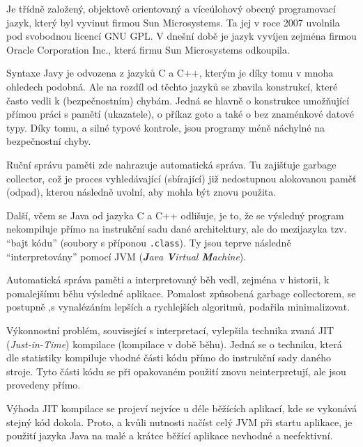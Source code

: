 Je třídně založený, objektově orientovaný a víceúlohový obecný programovací jazyk, který byl vyvinut firmou Sun Microsystems. Ta jej v roce 2007 uvolnila pod svobodnou licencí GNU GPL. V dnešní době je jazyk vyvíjen zejména firmou Oracle Corporation Inc., která firmu Sun Microsystems odkoupila.

Syntaxe Javy je odvozena z jazyků C a C++, kterým je díky tomu v mnoha ohledech podobná. Ale na rozdíl od těchto jazyků se zbavila konstrukcí, které často vedli k (bezpečnostním) chybám. Jedná se hlavně o konstrukce umožňující přímou práci s pamětí (ukazatele), o příkaz goto a také o bez znaménkové datové typy. Díky tomu, a silné typové kontrole, jsou programy méně náchylné na bezpečnostní chyby.

Ruční správu paměti zde nahrazuje automatická správa. Tu zajišťuje garbage collector, což je proces vyhledávající (sbírající) již nedostupnou alokovanou paměť (odpad), kterou následně uvolní, aby mohla být znovu použita.

Další, včem se Java od jazyka C a C++ odlišuje, je to, že se výsledný program nekompiluje přímo na instrukční sadu dané architektury, ale do mezijazyka tzv. "`bajt kódu"' (soubory s příponou \texttt{.class}). Ty jsou teprve následně "`interpretovány"' pomocí JVM (\emph{\textbf{J}ava \textbf{V}irtual \textbf{M}achine}).

Automatická správa paměti a interpretovaný běh vedl, zejména v historii, k pomalejšímu běhu výsledné aplikace. Pomalost způsobená garbage collectorem, se postupně ,s vynalézáním lepších a rychlejších algoritmů, podařila minimalizovat.

Výkonnostní problém, související s interpretací, vylepšila technika zvaná JIT (\emph{Just-in-Time}) kompilace (kompilace v době běhu). Jedná se o techniku, která dle statistiky kompiluje vhodné části kódu přímo do instrukční sady daného stroje. Tyto části kódu se při opakovaném použití znovu neinterpretují, ale jsou provedeny přímo.

Výhoda JIT kompilace se projeví nejvíce u déle běžících aplikací, kde se vykonává stejný kód dokola. Proto, a kvůli nutnosti načíst celý JVM při startu aplikace, je použití jazyka Java na malé a krátce běžící aplikace nevhodné a neefektivní.

